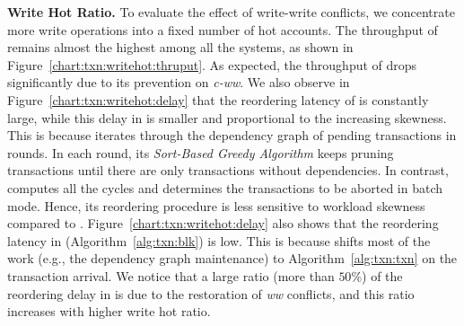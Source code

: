 \textbf{Write Hot Ratio.}
To evaluate the effect of write-write conflicts, we concentrate more write operations into a fixed number of hot accounts.
The throughput of {\fsF} remains almost the highest among all the systems, as shown in Figure~\ref{chart:txn:writehot:thruput}.
As expected, the throughput of {\fsS} drops significantly due to its prevention on \textit{c-ww}. 
We also observe in Figure~\ref{chart:txn:writehot:delay} that the reordering latency of {\fsP} is constantly large, 
while this delay in {\fsL} is smaller and proportional to the increasing skewness.
This is because {\fsL} iterates through the dependency graph of pending transactions in rounds. 
In each round, its \textit{Sort-Based Greedy Algorithm} keeps pruning transactions until there are only transactions without dependencies.
In contrast, {\fsP} computes all the cycles and determines the transactions to be aborted in batch mode. 
Hence, its reordering procedure is less sensitive to workload skewness compared to {\fsL}. 
Figure~\ref{chart:txn:writehot:delay} also shows that the reordering latency in {\fsF} (Algorithm~\ref{alg:txn:blk}) is low.
This is because {\fsF} shifts most of the work (e.g., the dependency graph maintenance) to Algorithm~\ref{alg:txn:txn} on the transaction arrival. 
We notice that a large ratio (more than $50$\%) of the reordering delay in
{\fsF} is due to the restoration of \textit{ww} conflicts, and this ratio increases
with higher write hot ratio.

